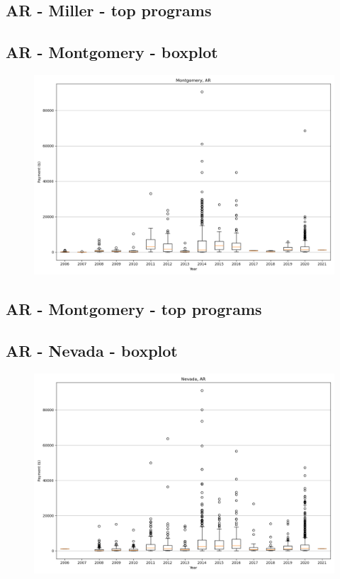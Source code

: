 \subsection*{AR - Miller - top programs}

\newpage
\subsection*{AR - Montgomery - boxplot}
\begin{figure}[h]
\centering
\includegraphics[width=7in]{../output/boxplots/counties/Montgomery-AR_boxplot.png}
\end{figure}


\subsection*{AR - Montgomery - top programs}

\newpage
\subsection*{AR - Nevada - boxplot}
\begin{figure}[h]
\centering
\includegraphics[width=7in]{../output/boxplots/counties/Nevada-AR_boxplot.png}
\end{figure}


